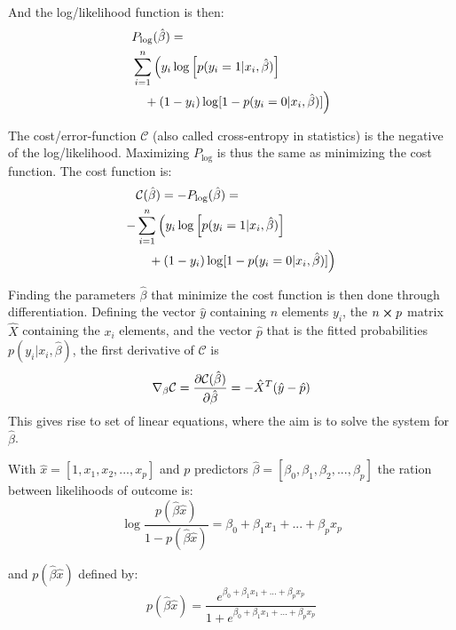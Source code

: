 And the log/likelihood function is then:
\begin{equation}
\begin{split}
    &P_{\log}(\hat{\beta}) = \\
    &\sum_{i=1}^n \Big(y_i \log \qty[p(y_i = 1|x_i,\hat{\beta})] \\
    &\quad+ (1-y_i) \log [1 - p(y_i = 0|x_i,\hat{\beta})]\Big)
\end{split}
\label{eq:log_p}
\end{equation}

The cost/error-function $\mathcal{C}$ (also called cross-entropy in statistics) is the negative of the log/likelihood. Maximizing $P_{\log}$ is thus the same as minimizing the cost function. The cost function is:
\begin{equation}
  \begin{split}
    &\mathcal{C}(\hat{\beta}) = - P_{\log}(\hat{\beta}) =  \\
    -&\sum_{i=1}^n \Big(y_i \log \qty[p(y_i = 1|x_i,\hat{\beta})] \\
    &\quad+ (1-y_i) \log [1 - p(y_i = 0|x_i,\hat{\beta})]\Big)
  \end{split}
  \label{eq:cost_function}
\end{equation}

Finding the parameters $\hat{\beta}$ that minimize the cost function is then done through differentiation.
Defining the vector $\hat{y}$ containing $n$ elements $y_i$, the $n \cross p$ matrix $\hat{X}$ containing the $x_i$ elements, and the vector $\hat{p}$ that is the fitted probabilities $p(y_i|x_i,\hat{\beta})$, the first derivative of $\mathcal{C}$ is
\begin{equation}
  \nabla_\beta \mathcal{C} = \pdv{\mathcal{C}(\hat{\beta})}{\hat{\beta}} = - \hat{X}^T (\hat{y}-\hat{p})
  \label{eq:cost_d}
\end{equation}
This gives rise to set of linear equations, where the aim is to solve the system for $\hat{\beta}$.

With $\hat{x} = [1, x_1,x_2,...,x_p]$ and $p$ predictors $\hat{\beta} = [\beta_0,\beta_1,\beta_2,...,\beta_p]$ the ration between likelihoods of outcome is:
\begin{equation}
  \log \frac{p(\hat{\beta}\hat{x})}{1-p(\hat{\beta}\hat{x})} = \beta_0 + \beta_1x_1 + ... + \beta_px_p
  \label{eq:prob_ratio}
\end{equation}

\noindent and $p(\hat{\beta}\hat{x})$ defined by:
\begin{equation}
  p(\hat{\beta}\hat{x}) = \frac{e^{\beta_0 + \beta_1x_1 + ... + \beta_px_p}}{1+e^{\beta_0 + \beta_1x_1 + ... + \beta_px_p}}
  \label{eq:pBx}
\end{equation}

